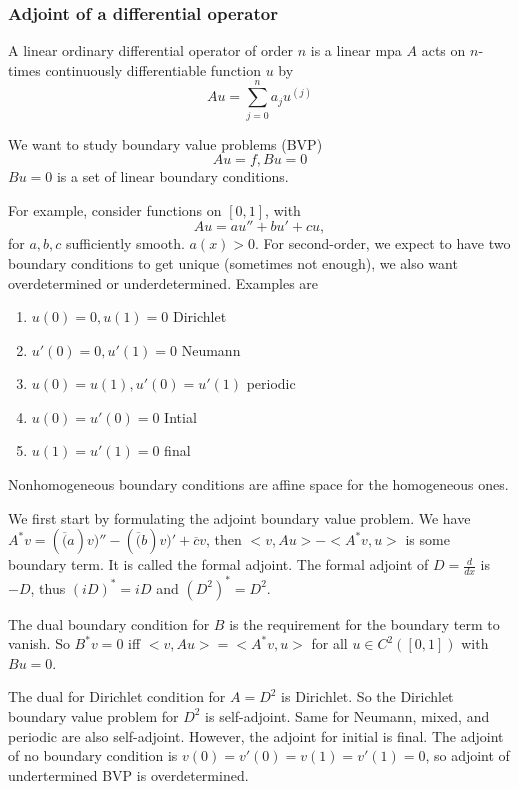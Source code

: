 \documentclass[main.tex]{subfiles}
\begin{document}
\subsubsection{Adjoint of a differential operator}
A linear ordinary differential operator of order $n$ is a linear mpa $A$ acts on $n$-times continuously differentiable function $u$ by 
$$
Au = \sum_{j=0} ^n a_j u^{(j)}
$$

We want to study boundary value problems (BVP)
$$
Au = f, Bu = 0
$$
$Bu = 0$ is a set of linear boundary conditions.

For example, consider functions on $[0,1]$, with 
$$
Au = a u'' + b u' + cu,
$$
for $a, b, c$ sufficiently smooth. $a(x) > 0$. For second-order, we expect to have two boundary conditions to get unique (sometimes not enough), we also want overdetermined or underdetermined. 
Examples are 
\begin{enumerate}
    \item $u(0) = 0, u(1) = 0$ Dirichlet
    \item $u'(0) =0, u'(1) = 0$ Neumann
    \item $u(0) = u(1), u'(0) = u'(1)$ periodic
    \item $u(0) = u'(0) = 0$ Intial
    \item $u(1) = u'(1) = 0$ final
\end{enumerate}

Nonhomogeneous boundary conditions are affine space for the homogeneous ones. 

We first start by formulating the adjoint boundary value problem. We have $A^* v = (\overline(a)v)'' - (\overline(b)v)' + \overline{c}v$, then $<v, Au> - <A^*v, u>$ is some boundary term. It is called the formal adjoint. The formal adjoint of $D = \frac{d}{dx}$ is $-D$, thus $(iD)^* = iD$ and $(D^2)^* = D^2$. 

The dual boundary condition for $B$ is the requirement for the boundary term to vanish. So $B^*v = 0$ iff $<v, Au> = <A^* v, u> $ for all $u \in C^2([0,1])$ with $Bu = 0$.

\begin{example}
The dual for Dirichlet condition for $A = D^2$ is Dirichlet. So the Dirichlet boundary value problem for $D^2$ is self-adjoint. Same for Neumann, mixed, and periodic are also self-adjoint. However, the adjoint for initial is final. The adjoint of no boundary condition is $v(0) = v'(0) = v(1) = v'(1) = 0$, so adjoint of undertermined BVP is overdetermined. 
\end{example}
\end{document}
